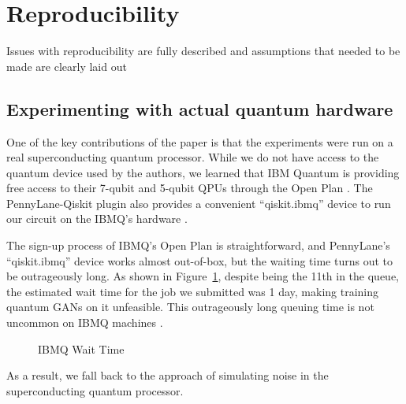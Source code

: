 \section{Reproducibility}
Issues with reproducibility are fully described and assumptions that needed to be made are clearly laid out


\subsection{Experimenting with actual quantum hardware}
One of the key contributions of the paper is that the experiments were run on a real superconducting quantum processor. While we do not have access to the quantum device used by the authors, we learned that IBM Quantum is providing free access to their 7-qubit and 5-qubit QPUs through the Open Plan \cite{ibmq_plans}. The PennyLane-Qiskit plugin also provides a convenient ``qiskit.ibmq'' device to run our circuit on the IBMQ's hardware \cite{pennylane-qiskit}. 

The sign-up process of IBMQ's Open Plan is straightforward, and PennyLane's ``qiskit.ibmq'' device works almost out-of-box, but the waiting time turns out to be outrageously long. As shown in Figure~\ref{fig:ibmq-wait-time}, despite being the 11th in the queue, the estimated wait time for the job we submitted was 1 day, making training quantum GANs on it unfeasible. This outrageously long queuing time is not uncommon on IBMQ machines \cite{ravi2021quantum}.

\begin{figure}[H]
    \centering
    \caption{IBMQ Wait Time}
    \label{fig:ibmq-wait-time}
\end{figure}

As a result, we fall back to the approach of simulating noise in the superconducting quantum processor. 

